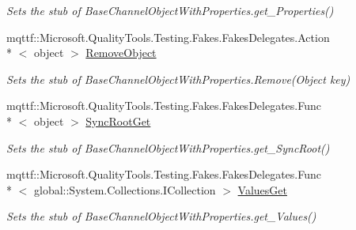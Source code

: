 \begin{DoxyCompactItemize}
\begin{DoxyCompactList}\small\item\em Sets the stub of Base\-Channel\-Object\-With\-Properties.\-get\-\_\-\-Properties()\end{DoxyCompactList}\item 
mqttf\-::\-Microsoft.\-Quality\-Tools.\-Testing.\-Fakes.\-Fakes\-Delegates.\-Action\\*
$<$ object $>$ \hyperlink{class_system_1_1_runtime_1_1_remoting_1_1_channels_1_1_fakes_1_1_stub_base_channel_sink_with_properties_a5b43268e1ae01a9ff7f97f9256d9932b}{Remove\-Object}
\begin{DoxyCompactList}\small\item\em Sets the stub of Base\-Channel\-Object\-With\-Properties.\-Remove(\-Object key)\end{DoxyCompactList}\item 
mqttf\-::\-Microsoft.\-Quality\-Tools.\-Testing.\-Fakes.\-Fakes\-Delegates.\-Func\\*
$<$ object $>$ \hyperlink{class_system_1_1_runtime_1_1_remoting_1_1_channels_1_1_fakes_1_1_stub_base_channel_sink_with_properties_a8896e26fd109beca772adce5141a80e1}{Sync\-Root\-Get}
\begin{DoxyCompactList}\small\item\em Sets the stub of Base\-Channel\-Object\-With\-Properties.\-get\-\_\-\-Sync\-Root()\end{DoxyCompactList}\item 
mqttf\-::\-Microsoft.\-Quality\-Tools.\-Testing.\-Fakes.\-Fakes\-Delegates.\-Func\\*
$<$ global\-::\-System.\-Collections.\-I\-Collection $>$ \hyperlink{class_system_1_1_runtime_1_1_remoting_1_1_channels_1_1_fakes_1_1_stub_base_channel_sink_with_properties_adb95e37411477cb9e3a12e3000bd27ac}{Values\-Get}
\begin{DoxyCompactList}\small\item\em Sets the stub of Base\-Channel\-Object\-With\-Properties.\-get\-\_\-\-Values()\end{DoxyCompactList}\end{DoxyCompactItemize}

